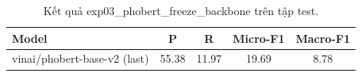 \begin{table}[t]
\centering
\begin{tabular}{lcccc}
\hline
\textbf{Model} & \textbf{P} & \textbf{R} & \textbf{Micro-F1} & \textbf{Macro-F1} \\
\hline
vinai/phobert-base-v2 (last) & 55.38 & 11.97 & 19.69 & 8.78 \\
\hline
\end{tabular}
\caption{Kết quả exp03_phobert_freeze_backbone trên tập test.}
\label{tab:main}
\end{table}